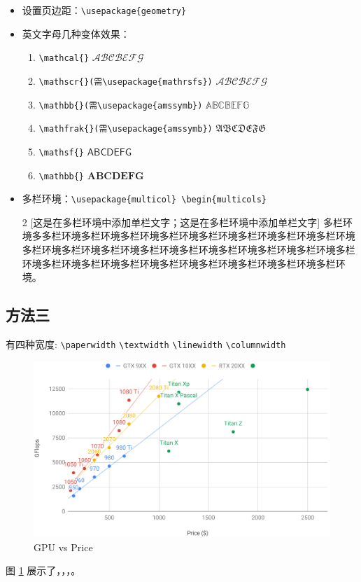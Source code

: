 \documentclass[a4paper, 12pt]{article} %
\numberwithin{equation}{section} %
\numberwithin{figure}{section} %
\begin{document}
\begin{itemize}
                \item 设置页边距：\verb|\usepackage{geometry}|
                \item 英文字母几种变体效果：
                    \begin{enumerate}
                        \item \verb|\mathcal{}| $\mathcal{ABCBEFG}$
                        \item \verb|\mathscr{}(需\usepackage{mathrsfs})| $\mathscr{ABCBEFG}$
                        \item \verb|\mathbb{}(需\usepackage{amssymb})| $\mathbb{ABCBEFG}$
                        \item \verb|\mathfrak{}(需\usepackage{amssymb})| $\mathfrak{ABCDEFG}$
                        \item \verb|\mathsf{}| $\mathsf{ABCDEFG}$
                        \item \verb|\mathbb{}| $\mathbf{ABCDEFG}$
                    \end{enumerate}
                \item 多栏环境：\verb|\usepackage{multicol} \begin{multicols}| \begin{multicols}{2}
                    [这是在多栏环境中添加单栏文字；这是在多栏环境中添加单栏文字]
                    多栏环境多多栏环境多栏环境多栏环境多栏环境多栏环境多栏环境多栏环境多栏环境多栏环境多栏环境多栏环境多栏环境多栏环境多栏环境多栏环境多栏环境多栏环境多栏环境多栏环境多栏环境多栏环境多栏环境多栏环境多栏环境多栏环境。
                \end{multicols}
            \end{itemize}
            
        \subsection{方法三} \label{subsec:method3}
            有四种宽度: 
            \verb|\paperwidth| \quad 
            \verb|\textwidth| \quad
            \verb|\linewidth| \quad
            \verb|\columnwidth|
            \begin{figure}[H] %
                \centering
                \includegraphics[width=0.9\linewidth]{img/GPU-flops-vs-price.png}
                \caption{\label{figure:gpu} GPU vs Price}
            \end{figure}
            图 \ref{figure:gpu} 展示了，，，。
\end{document}
